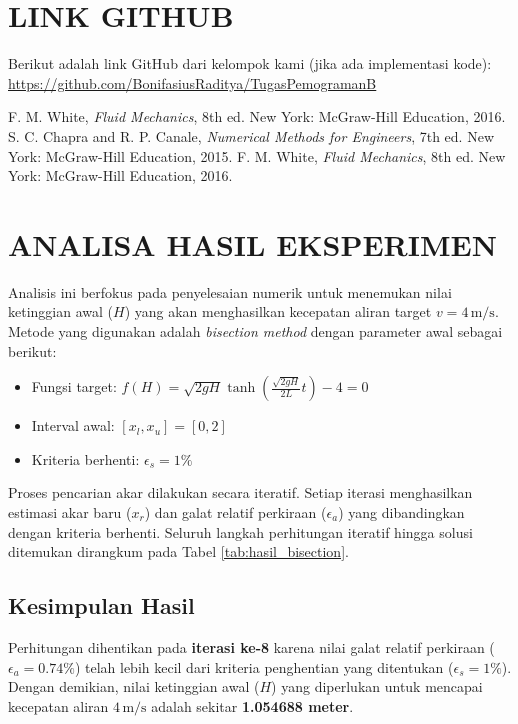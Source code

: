 \documentclass[conference]{IEEEtran}
\begin{document}
\section{LINK GITHUB}
Berikut adalah link GitHub dari kelompok kami (jika ada implementasi kode):
\url{https://github.com/BonifasiusRaditya/TugasPemogramanB} %

\begin{thebibliography}{00}
 F. M. White, \textit{Fluid Mechanics}, 8th ed. New York: McGraw-Hill Education, 2016.
 S. C. Chapra and R. P. Canale, \textit{Numerical Methods for Engineers}, 7th ed. New York: McGraw-Hill Education, 2015.
 F. M. White, \textit{Fluid Mechanics}, 8th ed. New York: McGraw-Hill Education, 2016.
\end{thebibliography}
\vspace{12pt}

\section{ANALISA HASIL EKSPERIMEN}

Analisis ini berfokus pada penyelesaian numerik untuk menemukan nilai ketinggian awal ($H$) yang akan menghasilkan kecepatan aliran target $v=4 \, \text{m/s}$. Metode yang digunakan adalah \textit{bisection method} dengan parameter awal sebagai berikut:
\begin{itemize}
    \item Fungsi target: $f(H) = \sqrt{2gH} \tanh\left(\frac{\sqrt{2gH}}{2L}t\right) - 4 = 0$
    \item Interval awal: $[x_l, x_u] = [0, 2]$
    \item Kriteria berhenti: $\epsilon_s = 1\%$
\end{itemize}

Proses pencarian akar dilakukan secara iteratif. Setiap iterasi menghasilkan estimasi akar baru ($x_r$) dan galat relatif perkiraan ($\epsilon_a$) yang dibandingkan dengan kriteria berhenti. Seluruh langkah perhitungan iteratif hingga solusi ditemukan dirangkum pada Tabel \ref{tab:hasil_bisection}.

\subsection*{Kesimpulan Hasil}
Perhitungan dihentikan pada \textbf{iterasi ke-8} karena nilai galat relatif perkiraan ($\epsilon_a = 0.74\%$) telah lebih kecil dari kriteria penghentian yang ditentukan ($\epsilon_s = 1\%$). Dengan demikian, nilai ketinggian awal ($H$) yang diperlukan untuk mencapai kecepatan aliran $4 \, \text{m/s}$ adalah sekitar \textbf{1.054688 meter}.
\end{document}
